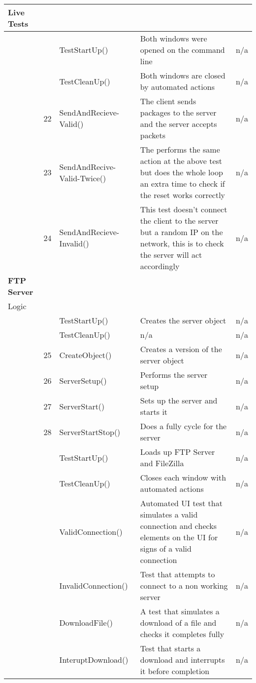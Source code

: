 \begin{appendices}
\begin{longtable}{| p{2cm} | p{0.5cm} | p{4cm} | p{5cm} | p{3cm} |}
		Live Tests &&&& \\ \hline
		&& TestStartUp() & Both windows were opened on the command line & n/a \\ \hline
		&& TestCleanUp() & Both windows are closed by automated actions & n/a \\ \hline
		&22& SendAndRecieve-Valid() & The client sends packages to the server and the server accepts packets & n/a \\ \hline
		&23& SendAndRecive-Valid-Twice() & The performs the same action at the above test but does the whole loop an extra time to check if the reset works correctly & n/a \\ \hline
		&24& SendAndRecieve-Invalid() & This test doesn't connect the client to the server but a random IP on the network, this is to check the server will act accordingly & n/a \\ \hline

		\bf{FTP Server} &&&& \\ \hline
		
		Logic &&&& \\ \hline
		&& TestStartUp() & Creates the server object & n/a \\ \hline
		&& TestCleanUp() & n/a & n/a \\ \hline
		&25& CreateObject() & Creates a version of the server object & n/a \\ \hline
		&26& ServerSetup() & Performs the server setup & n/a \\ \hline
		&27& ServerStart() & Sets up the server and starts it & n/a \\ \hline
		&28& ServerStartStop() & Does a fully cycle for the server & n/a \\ \hline
		
		&& TestStartUp() & Loads up FTP Server and FileZilla & n/a \\ \hline
		&& TestCleanUp() & Closes each window with automated actions & n/a \\ \hline
		&& ValidConnection() & Automated UI test that simulates a valid connection and checks elements on the UI for signs of a valid connection & n/a \\ \hline
		&& InvalidConnection() & Test that attempts to connect to a non working server & n/a \\ \hline
		&& DownloadFile() & A test that simulates a download of a file and checks it completes fully & n/a \\ \hline
		&& InteruptDownload() & Test that starts a download and interrupts it before completion & n/a \\ \hline
	\hline
\end{longtable}


\end{appendices}

